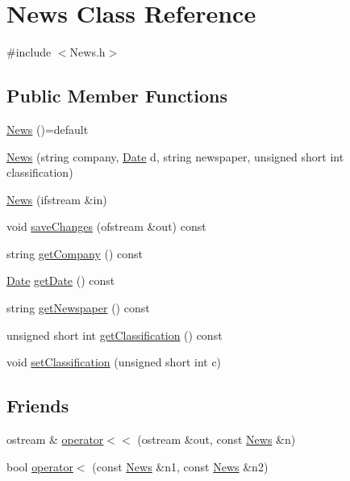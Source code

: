 \hypertarget{class_news}{}\section{News Class Reference}
\label{class_news}


{\ttfamily \#include $<$News.\+h$>$}

\subsection*{Public Member Functions}
\begin{DoxyCompactItemize}
\item 
\hyperlink{class_news_aa82f7305493ddd4a7e66709b64514564}{News} ()=default
\item 
\hyperlink{class_news_aa8fb1803abb881755646e465e540aeb2}{News} (string company, \hyperlink{class_date}{Date} d, string newspaper, unsigned short int classification)
\item 
\hyperlink{class_news_a3f45f75b0acaab82815942af625cc28b}{News} (ifstream \&in)
\item 
void \hyperlink{class_news_a138d8508a5b0f9e42ea7e1b45e109a64}{save\+Changes} (ofstream \&out) const
\item 
string \hyperlink{class_news_aa95b12d89e76616f0fbfd34d4d6bfab6}{get\+Company} () const
\item 
\hyperlink{class_date}{Date} \hyperlink{class_news_ac0970d5b32fede42e29a3b326113cda0}{get\+Date} () const
\item 
string \hyperlink{class_news_af94abb955ce219bce13bb3169df25826}{get\+Newspaper} () const
\item 
unsigned short int \hyperlink{class_news_a8a4ee8e5da2485868cd8b25105d55299}{get\+Classification} () const
\item 
void \hyperlink{class_news_adc82fcf213f23b2598a26d59a697d651}{set\+Classification} (unsigned short int c)
\end{DoxyCompactItemize}
\subsection*{Friends}
\begin{DoxyCompactItemize}
\item 
ostream \& \hyperlink{class_news_a9440c22f12d6ed3e7c1026dd53e8da61}{operator$<$$<$} (ostream \&out, const \hyperlink{class_news}{News} \&n)
\item 
bool \hyperlink{class_news_acca70bd436d0fa5aef509c188a8195a4}{operator$<$} (const \hyperlink{class_news}{News} \&n1, const \hyperlink{class_news}{News} \&n2)
\end{DoxyCompactItemize}


